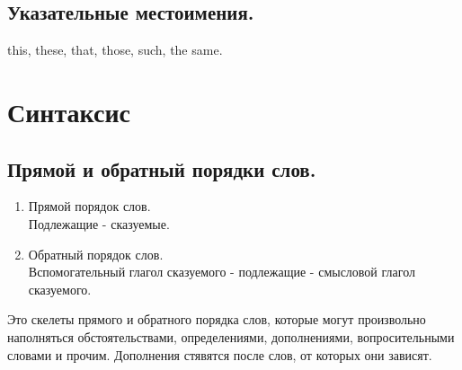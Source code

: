 \documentclass[oneside]{book}
\begin{document}
	\section{Указательные местоимения.}
	this, these, that, those, such, the same.

	\chapter{Синтаксис}
	\section{Прямой и обратный порядки слов.}
	\begin{enumerate}
		\item Прямой порядок слов.
		\\
		Подлежащие - сказуемые.

		\item Обратный порядок слов.
		\\
		Вспомогательный глагол сказуемого - подлежащие - смысловой глагол сказуемого.
	\end{enumerate}

	Это скелеты прямого и обратного порядка слов, которые могут произвольно
	наполняться обстоятельствами, определениями, дополнениями, вопросительными словами и прочим.
	Дополнения стявятся после слов, от которых они зависят.
\end{document}
